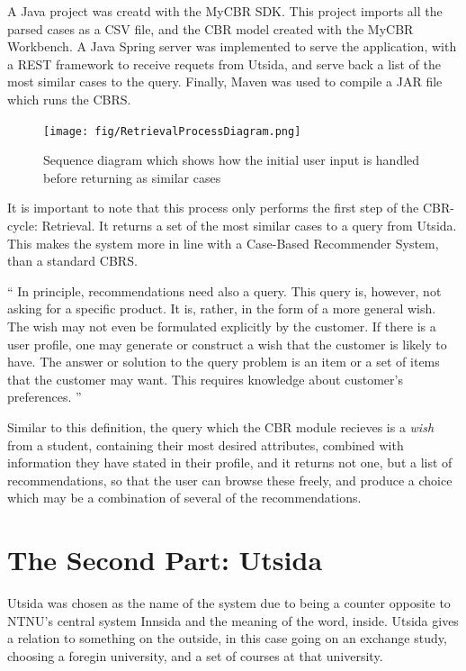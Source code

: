 A Java project was creatd with the MyCBR SDK. This project imports all the parsed cases as a CSV file, and the CBR model created with the MyCBR Workbench. A Java Spring server was implemented to serve the application, with a REST framework to receive requets from Utsida, and serve back a list of the most similar cases to the query. Finally, Maven was used to compile a JAR file which runs the CBRS. 

\begin{figure}[H]
    \label{fig:retrieval_process_diagram}
    \centering
    \texttt{[image: fig/RetrievalProcessDiagram.png]}
    \caption{Sequence diagram which shows how the initial user input is handled before returning as similar cases}
\end{figure}

It is important to note that this process only performs the first step of the CBR-cycle: Retrieval. It returns a set of the most similar cases to a query from Utsida. This makes the system more in line with a Case-Based Recommender System, than a standard CBRS. 

\begin{displayquote}\enquote{
In principle, recommendations need also a query. This query is, however, not asking
for a specific product. It is, rather, in the form of a more general wish. The wish may
not even be formulated explicitly by the customer. If there is a user profile, one may
generate or construct a wish that the customer is likely to have.
The answer or solution to the query problem is an item or a set of items that the
customer may want. This requires knowledge about customer’s preferences.\cite{richter2013case}
}\end{displayquote}

Similar to this definition, the query which the CBR module recieves is a \emph{wish} from a student, containing their most desired attributes, combined with information they have stated in their profile, and it returns not one, but a list of recommendations, so that the user can browse these freely, and produce a choice which may be a combination of several of the recommendations.

\section{The Second Part: Utsida}
Utsida was chosen as the name of the system due to being a counter opposite to NTNU's central system Innsida and the meaning of the word, inside. Utsida gives a relation to something on the outside, in this case going on an exchange study, choosing a foregin university, and a set of courses at that university.

